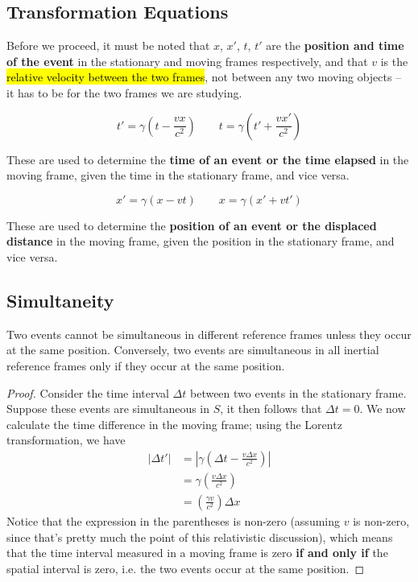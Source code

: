 \documentclass[a4paper,12pt]{article}
\newcommand{\lb}{\\[8pt]}
\newcommand{\paren}[1]{\left(#1\right)}
\begin{document}
\subsection{Transformation Equations}
Before we proceed, it must be noted that $x$, $x'$, $t$, $t'$ are the \textbf{position and time of the event} in the stationary and moving frames respectively, and that $v$ is the \hl{relative velocity between the two frames}, not between any two moving objects -- it has to be for the two frames we are studying.

\begin{equation}
  t' = \gamma \paren{t - \frac{vx}{c^2}} \quad \quad t = \gamma \paren{t' + \frac{vx'}{c^2}}
\end{equation}

These are used to determine the \textbf{time of an event or the time elapsed} in the moving frame, given the time in the stationary frame, and vice versa.

\begin{equation}
  x' = \gamma \paren{x - vt} \quad \quad x = \gamma \paren{x' + vt'}
\end{equation}

These are used to determine the \textbf{position of an event or the displaced distance} in the moving frame, given the position in the stationary frame, and vice versa.\lb

\pagebreak

\subsection{Simultaneity}

\begin{prop}
  Two events cannot be simultaneous in different reference frames unless they occur at the same position. Conversely, two events are simultaneous in all inertial reference frames only if they occur at the same position.
  \begin{proof}
    Consider the time interval $\Delta t$ between two events in the stationary frame. Suppose these events are simultaneous in $S$, it then follows that $\Delta t = 0$. We now calculate the time difference in the moving frame; using the Lorentz transformation, we have
    \begin{align*}
      \lvert\Delta t'\rvert & = \left|\gamma\paren{\Delta t - \frac{v\Delta x}{c^2}}\right| \\
                            & = \gamma\paren{\frac{v\Delta x}{c^2}}                         \\
                            & = \paren{\frac{\gamma v}{c^2}}\Delta x
    \end{align*}
    Notice that the expression in the parentheses is non-zero (assuming $v$ is non-zero, since that's pretty much the point of this relativistic discussion), which means that the time interval measured in a moving frame is zero \textbf{if and only if} the spatial interval is zero, i.e. the two events occur at the same position.
  \end{proof}
\end{prop}
\end{document}
